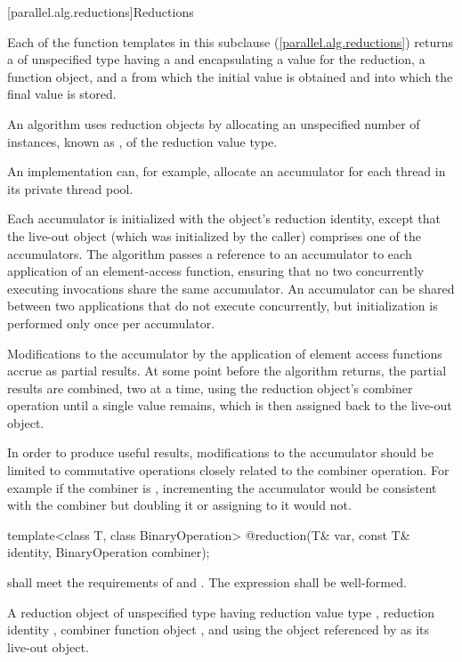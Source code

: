 [parallel.alg.reductions]{Reductions}

\pnum
Each of the function templates in this subclause
(\ref{parallel.alg.reductions}) returns a  of unspecified type
having a  and encapsulating a  value for
the reduction, a  function object, and a  from which the
initial value is obtained and into which the final value is stored.

\pnum
An algorithm uses reduction objects by allocating an unspecified number
of instances, known as , of the reduction value type. \begin{note}An
implementation can, for example, allocate an accumulator for each thread in
its private thread pool.\end{note} Each accumulator is initialized with the
object's reduction identity, except that the live-out object (which was
    initialized by the caller) comprises one of the accumulators. The algorithm
passes a reference to an accumulator to each application of an element-access
function, ensuring that no two concurrently executing invocations share the
same accumulator. An accumulator can be shared between two applications that do
not execute concurrently, but initialization is performed only once per
accumulator.

\pnum
Modifications to the accumulator by the application of element access
functions accrue as partial results. At some point before the algorithm
returns, the partial results are combined, two at a time, using the reduction
object's combiner operation until a single value remains, which is then
assigned back to the live-out object. \begin{note}In order to produce useful
results, modifications to the accumulator should be limited to commutative
operations closely related to the combiner operation. For example if the
combiner is , incrementing the accumulator would be consistent with the
combiner but doubling it or assigning to it would not.\end{note}

\begin{itemdecl}
template<class T, class BinaryOperation>
  @\unspec@ reduction(T& var, const T& identity, BinaryOperation combiner);
\end{itemdecl}

\begin{itemdescr}
  \pnum
  \requires {} shall meet the requirements of  and . The expression  shall be well-formed.

  \pnum
  \returns A reduction object of unspecified type having reduction value type , reduction identity , combiner function object , and using the object referenced by  as its live-out object.
\end{itemdescr}

